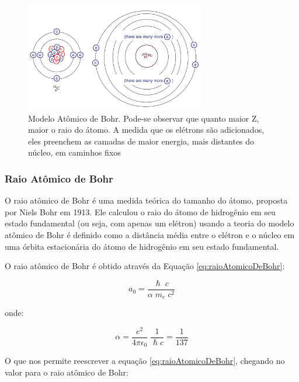 \documentclass[11pt,a4paper]{article}
\begin{document}
                \begin{figure}[h]
                    \centering
                    \includegraphics[width=0.7\textwidth]{Imagens/modeloAtomicoDeBohr.jpg}
                    \caption{Modelo Atômico de Bohr. Pode-se observar que quanto maior Z, maior o raio do átomo. A medida que os elétrons são adicionados, eles preenchem as camadas de maior energia, mais distantes do núcleo, em caminhos fixos}
                    \label{fig:modeloAtomicoDeBohr}
                \end{figure}

            \subsubsection{Raio Atômico de Bohr}

                O raio atômico de Bohr é uma medida teórica do tamanho do átomo, proposta por Niels Bohr em 1913. Ele calculou o raio do átomo de hidrogênio em seu estado fundamental (ou seja, com apenas um elétron) usando a teoria do modelo atômico de Bohr é definido como a distância média entre o elétron e o núcleo em uma órbita estacionária do átomo de hidrogênio em seu estado fundamental. 

                O raio atômico de Bohr é obtido através da Equação \ref{eq:raioAtomicoDeBohr}:

                \begin{equation}
                    a_0 = \frac{\hslash \; c}{\alpha \; m_e \; c^2}
                    \label{eq:raioAtomicoDeBohr}
                \end{equation}

                onde:

                $$\alpha = \frac{e^2}{4 \pi \epsilon_0} \; \frac{1}{\hslash c} = \frac{1}{137}$$


                O que nos permite reescrever a equação \ref{eq:raioAtomicoDeBohr}, chegando no valor para o raio atômico de Bohr:
\end{document}
